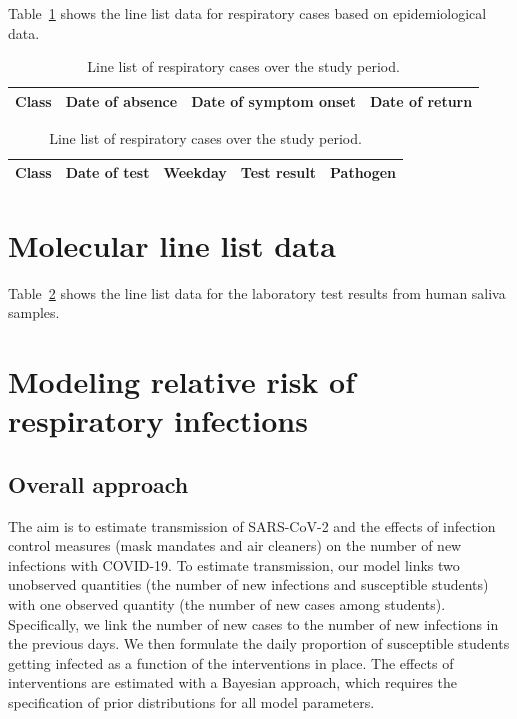 \documentclass[fleqn,11pt]{wlscirep_supp}
\begin{document}
Table~\ref{tab:epi-data-line-list} shows the line list data for respiratory cases based on epidemiological data.

{\footnotesize\begin{longtable}{l l l l}
    \caption[Line list of respiratory cases over the study period]{Line list of respiratory cases over the study period.}\label{tab:epi-data-line-list} \\
    \toprule
    Class & Date of absence & Date of symptom onset & Date of return \\
    \midrule
    
    \bottomrule
\end{longtable}}

{\footnotesize\begin{longtable}{l l l l l}
    \caption[Line list of molecular test results over the study period]{Line list of respiratory cases over the study period.}\label{tab:mol-data-line-list} \\
    \toprule
    Class & Date of test & Weekday & Test result & Pathogen \\
    \midrule
    
    \bottomrule
\end{longtable}}

\clearpage

\section{Molecular line list data}\label{sec:mol-data}

Table~\ref{tab:mol-data-line-list} shows the line list data for the laboratory test results from human saliva samples.

\clearpage

\section{Modeling relative risk of respiratory infections}\label{sec:transmission-model}

\subsection{Overall approach}

The aim is to estimate transmission of SARS-CoV-2 and the effects of infection control measures (mask mandates and air cleaners) on the number of new infections with COVID-19. To estimate transmission, our model links two unobserved quantities (the number of new infections and susceptible students) with one observed quantity (the number of new cases among students). Specifically, we link the number of new cases to the number of new infections in the previous days. We then formulate the daily proportion of susceptible students getting infected as a function of the interventions in place. The effects of interventions are estimated with a Bayesian approach, which requires the specification of prior distributions for all model parameters.
\end{document}
